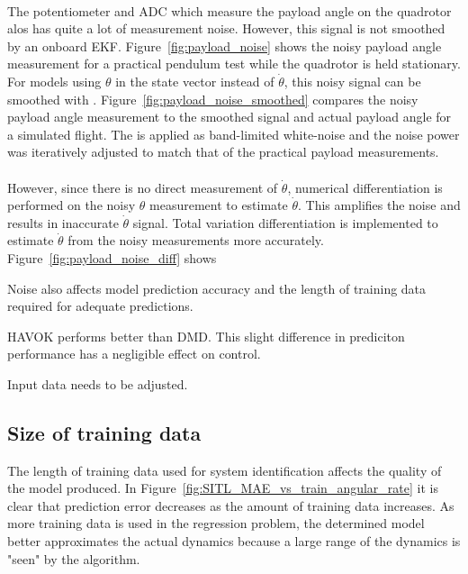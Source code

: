         \paragraph{}
        The potentiometer and ADC which measure the payload angle on the quadrotor alos has quite a lot of measurement noise.
        However, this signal is not smoothed by an onboard EKF.
        Figure~\ref{fig:payload_noise} shows the noisy payload angle measurement for a practical pendulum test while the quadrotor is held stationary.
        For models using $\theta$ in the state vector instead of $\dot{\theta}$, 
        this noisy signal can be smoothed with .
        Figure~\ref{fig:payload_noise_smoothed} compares the noisy payload angle measurement to the smoothed signal and actual payload angle for a simulated flight.
        The is applied as band-limited white-noise and the noise power was iteratively adjusted to match that of the practical payload measurements.
        
        \paragraph{}
        However, since there is no direct measurement of $\dot{\theta}$, 
        numerical differentiation is performed on the noisy $\theta$ measurement to estimate $\dot{\theta}$. 
        This amplifies the noise and results in inaccurate $\dot{\theta}$ signal.
        Total variation differentiation is implemented to estimate $\dot{\theta}$ from the noisy measurements more accurately. \cite{}
        Figure~\ref{fig:payload_noise_diff} shows
        

        Noise also affects model prediction accuracy and the length of training data required for adequate predictions. 
        
        

        

        HAVOK performs better than DMD.
        This slight difference in prediciton performance has a negligible effect on control.
        

        Input data needs to be adjusted.

    

    \subsection{Size of training data}
        The length of training data used for system identification affects the quality of the model produced.
        In Figure~\ref{fig:SITL_MAE_vs_train_angular_rate} it is clear that prediction error decreases as the amount of training data increases.
        As more training data is used in the regression problem, 
        the determined model better approximates the actual dynamics because a large range of the dynamics is "seen" by the algorithm.
        

